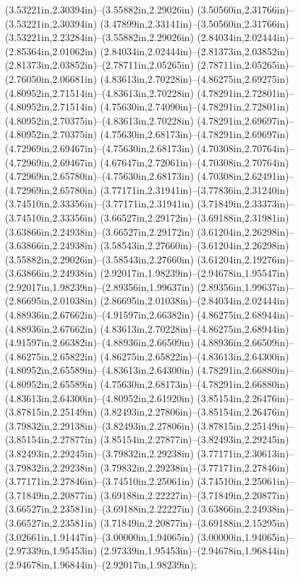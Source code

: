 (3.53221in,2.30394in)--(3.55882in,2.29026in) (3.50560in,2.31766in)--(3.53221in,2.30394in) (3.47899in,2.33141in)--(3.50560in,2.31766in) (3.53221in,2.23284in)--(3.55882in,2.29026in) (2.84034in,2.02444in)--(2.85364in,2.01062in) (2.84034in,2.02444in)--(2.81373in,2.03852in) (2.81373in,2.03852in)--(2.78711in,2.05265in) (2.78711in,2.05265in)--(2.76050in,2.06681in) (4.83613in,2.70228in)--(4.86275in,2.69275in) (4.80952in,2.71514in)--(4.83613in,2.70228in) (4.78291in,2.72801in)--(4.80952in,2.71514in) (4.75630in,2.74090in)--(4.78291in,2.72801in) (4.80952in,2.70375in)--(4.83613in,2.70228in) (4.78291in,2.69697in)--(4.80952in,2.70375in) (4.75630in,2.68173in)--(4.78291in,2.69697in) (4.72969in,2.69467in)--(4.75630in,2.68173in) (4.70308in,2.70764in)--(4.72969in,2.69467in) (4.67647in,2.72061in)--(4.70308in,2.70764in) (4.72969in,2.65780in)--(4.75630in,2.68173in) (4.70308in,2.62491in)--(4.72969in,2.65780in) (3.77171in,2.31941in)--(3.77836in,2.31240in) (3.74510in,2.33356in)--(3.77171in,2.31941in) (3.71849in,2.33373in)--(3.74510in,2.33356in) (3.66527in,2.29172in)--(3.69188in,2.31981in) (3.63866in,2.24938in)--(3.66527in,2.29172in) (3.61204in,2.26298in)--(3.63866in,2.24938in) (3.58543in,2.27660in)--(3.61204in,2.26298in) (3.55882in,2.29026in)--(3.58543in,2.27660in) (3.61204in,2.19276in)--(3.63866in,2.24938in) (2.92017in,1.98239in)--(2.94678in,1.95547in) (2.92017in,1.98239in)--(2.89356in,1.99637in) (2.89356in,1.99637in)--(2.86695in,2.01038in) (2.86695in,2.01038in)--(2.84034in,2.02444in) (4.88936in,2.67662in)--(4.91597in,2.66382in) (4.86275in,2.68944in)--(4.88936in,2.67662in) (4.83613in,2.70228in)--(4.86275in,2.68944in) (4.91597in,2.66382in)--(4.88936in,2.66509in) (4.88936in,2.66509in)--(4.86275in,2.65822in) (4.86275in,2.65822in)--(4.83613in,2.64300in) (4.80952in,2.65589in)--(4.83613in,2.64300in) (4.78291in,2.66880in)--(4.80952in,2.65589in) (4.75630in,2.68173in)--(4.78291in,2.66880in) (4.83613in,2.64300in)--(4.80952in,2.61920in) (3.85154in,2.26476in)--(3.87815in,2.25149in) (3.82493in,2.27806in)--(3.85154in,2.26476in) (3.79832in,2.29138in)--(3.82493in,2.27806in) (3.87815in,2.25149in)--(3.85154in,2.27877in) (3.85154in,2.27877in)--(3.82493in,2.29245in) (3.82493in,2.29245in)--(3.79832in,2.29238in) (3.77171in,2.30613in)--(3.79832in,2.29238in) (3.79832in,2.29238in)--(3.77171in,2.27846in) (3.77171in,2.27846in)--(3.74510in,2.25061in) (3.74510in,2.25061in)--(3.71849in,2.20877in) (3.69188in,2.22227in)--(3.71849in,2.20877in) (3.66527in,2.23581in)--(3.69188in,2.22227in) (3.63866in,2.24938in)--(3.66527in,2.23581in) (3.71849in,2.20877in)--(3.69188in,2.15295in) (3.02661in,1.91447in)--(3.00000in,1.94065in) (3.00000in,1.94065in)--(2.97339in,1.95453in) (2.97339in,1.95453in)--(2.94678in,1.96844in) (2.94678in,1.96844in)--(2.92017in,1.98239in);
